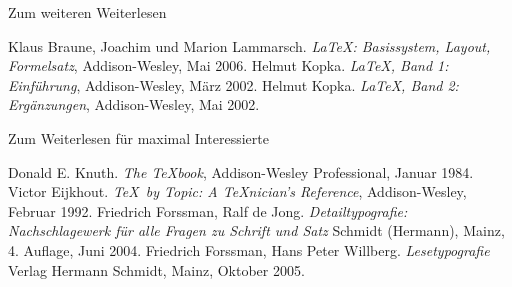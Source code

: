 \begin{Frame}[fragile]{Zum weiteren Weiterlesen}
  \begin{mybib}
      Klaus Braune, Joachim und Marion Lammarsch.
      \newblock \emph{\LaTeX: Basissystem, Layout, Formelsatz},
      \newblock Addison-Wesley, Mai 2006.
      Helmut Kopka.
      \newblock \emph{\LaTeX, Band 1: Einführung},
      \newblock Addison-Wesley, März 2002.
      Helmut Kopka.
      \newblock \emph{\LaTeX, Band 2: Ergänzungen},
      \newblock Addison-Wesley, Mai 2002.
  \end{mybib}
\end{Frame}

\begin{Frame}[fragile]{Zum Weiterlesen für maximal Interessierte}
  \begin{mybib}
      Donald E. Knuth.
      \newblock \emph{The \TeX book},
      \newblock Addison-Wesley Professional, Januar 1984.
      Victor Eijkhout.
      \newblock \emph{\TeX\ by Topic: A \TeX nician's Reference},
      \newblock Addison-Wesley, Februar 1992.
      Friedrich Forssman, Ralf de Jong.
      \newblock \emph{Detailtypografie: Nachschlagewerk für alle Fragen zu Schrift und Satz}
      \newblock Schmidt (Hermann), Mainz, 4. Auflage, Juni 2004.
      Friedrich Forssman, Hans Peter Willberg.
      \newblock \emph{Lesetypografie}
      \newblock Verlag Hermann Schmidt, Mainz, Oktober 2005.
  \end{mybib}
\end{Frame}
